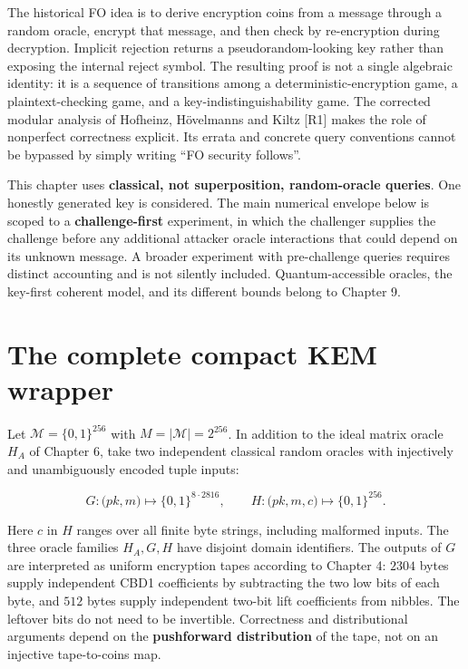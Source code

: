 \documentclass[
  11pt,
  a4paper,
  oneside]{report}
\begin{document}
The historical FO idea is to derive encryption coins from a message
through a random oracle, encrypt that message, and then check by
re-encryption during decryption. Implicit rejection returns a
pseudorandom-looking key rather than exposing the internal reject
symbol. The resulting proof is not a single algebraic identity: it is a
sequence of transitions among a deterministic-encryption game, a
plaintext-checking game, and a key-indistinguishability game. The
corrected modular analysis of Hofheinz, Hövelmanns and Kiltz {[}R1{]}
makes the role of nonperfect correctness explicit. Its errata and
concrete query conventions cannot be bypassed by simply writing ``FO
security follows''.

This chapter uses \textbf{classical, not superposition, random-oracle
queries}. One honestly generated key is considered. The main numerical
envelope below is scoped to a \textbf{challenge-first} experiment, in
which the challenger supplies the challenge before any additional
attacker oracle interactions that could depend on its unknown message. A
broader experiment with pre-challenge queries requires distinct
accounting and is not silently included. Quantum-accessible oracles, the
key-first coherent model, and its different bounds belong to Chapter 9.

\section{The complete compact KEM
wrapper}\label{the-complete-compact-kem-wrapper}

Let \(\mathcal M=\{0,1\}^{256}\) with \(M=|\mathcal M|=2^{256}\). In
addition to the ideal matrix oracle \(H_A\) of Chapter 6, take two
independent classical random oracles with injectively and unambiguously
encoded tuple inputs:

\[
G:\bigl(pk,m\bigr)\longmapsto \{0,1\}^{8\cdot2816},
\qquad
H:\bigl(pk,m,c\bigr)\longmapsto\{0,1\}^{256}.
\]

Here \(c\) in \(H\) ranges over all finite byte strings, including
malformed inputs. The three oracle families \(H_A,G,H\) have disjoint
domain identifiers. The outputs of \(G\) are interpreted as uniform
encryption tapes according to Chapter 4: \(2304\) bytes supply
independent CBD1 coefficients by subtracting the two low bits of each
byte, and \(512\) bytes supply independent two-bit lift coefficients
from nibbles. The leftover bits do not need to be invertible.
Correctness and distributional arguments depend on the
\textbf{pushforward distribution} of the tape, not on an injective
tape-to-coins map.
\end{document}
